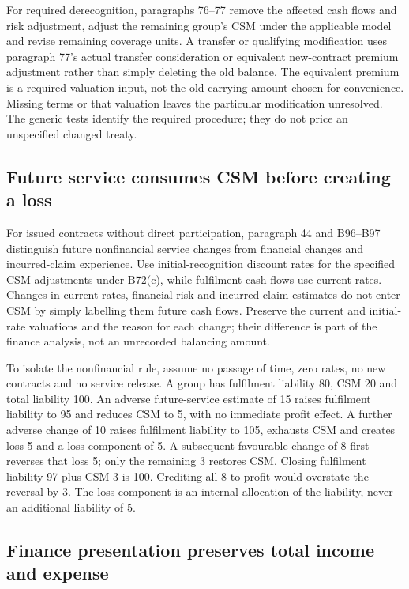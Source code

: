 For required derecognition, paragraphs 76--77 remove the affected cash flows and risk adjustment, adjust the remaining group's CSM under the applicable model and revise remaining coverage units. A transfer or qualifying modification uses paragraph 77's actual transfer consideration or equivalent new-contract premium adjustment rather than simply deleting the old balance. The equivalent premium is a required valuation input, not the old carrying amount chosen for convenience. Missing terms or that valuation leaves the particular modification unresolved. The generic tests identify the required procedure; they do not price an unspecified changed treaty.

\hypertarget{future-service-consumes-csm-before-creating-a-loss}{%
\subsection{Future service consumes CSM before creating a loss}\label{future-service-consumes-csm-before-creating-a-loss}}

For issued contracts without direct participation, paragraph 44 and B96--B97 \citep[IFRS~17.44,48--52,B72,B96--97]{eu20231803} distinguish future nonfinancial service changes from financial changes and incurred-claim experience. Use initial-recognition discount rates for the specified CSM adjustments under B72(c), while fulfilment cash flows use current rates. Changes in current rates, financial risk and incurred-claim estimates do not enter CSM by simply labelling them future cash flows. Preserve the current and initial-rate valuations and the reason for each change; their difference is part of the finance analysis, not an unrecorded balancing amount.

To isolate the nonfinancial rule, assume no passage of time, zero rates, no new contracts and no service release. A group has fulfilment liability 80, CSM 20 and total liability 100. An adverse future-service estimate of 15 raises fulfilment liability to 95 and reduces CSM to 5, with no immediate profit effect. A further adverse change of 10 raises fulfilment liability to 105, exhausts CSM and creates loss 5 and a loss component of 5. A subsequent favourable change of 8 first reverses that loss 5; only the remaining 3 restores CSM. Closing fulfilment liability 97 plus CSM 3 is 100. Crediting all 8 to profit would overstate the reversal by 3. The loss component is an internal allocation of the liability, never an additional liability of 5.

\hypertarget{finance-presentation-preserves-total-income-and-expense}{%
\subsection{Finance presentation preserves total income and expense}\label{finance-presentation-preserves-total-income-and-expense}}

